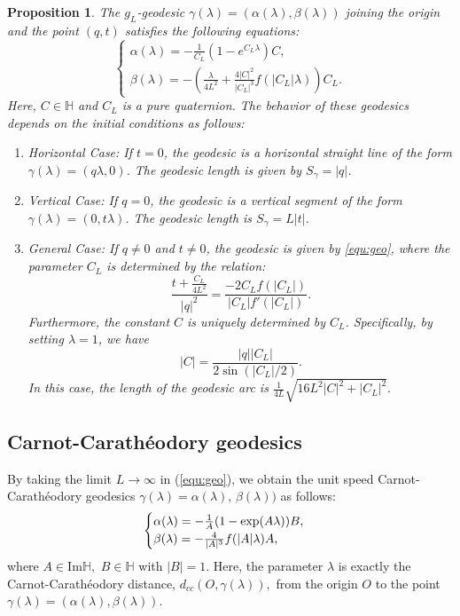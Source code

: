 \documentclass [12pt,a4paper]{amsart}
\renewcommand{\Im}{\textrm{Im}}
\newcommand{\mH}{\mathbb{H}}
\theoremstyle{plain}
\newtheorem{prop}[thm]{Proposition}
\theoremstyle{definition}
\numberwithin{equation}{section}
\begin{document}
\begin{prop}
The $g_L$-geodesic $\gamma(\lambda) = (\alpha(\lambda), \beta(\lambda))$ joining the origin and the point $(q,t)$ satisfies the following equations:
 \begin{equation}\label{equ:geo}
\begin{cases}
\alpha(\lambda) = -\frac{1}{{C}_L} \left( 1 - e^{C_L \lambda} \right) C, \\
\beta(\lambda) = -\left( \frac{\lambda}{4L^2} + \frac{4|C|^2}{|C_L|^3} f(|C_L|\lambda) \right) C_L.
\end{cases}
\end{equation}
Here, $C\in\mH$ and $C_L$ is a pure quaternion.
The behavior of these geodesics depends on the initial conditions as follows:
\begin{enumerate}
\item[(i)] {\it Horizontal Case:} If $t=0$, the geodesic is a horizontal straight line of the form $\gamma(\lambda) = (q\lambda, 0)$. The geodesic length is given by $S_\gamma = |q|$.

\item[(ii)] {\it Vertical Case:} If $q=0$, the geodesic is a vertical segment of the form $\gamma(\lambda) = (0, t\lambda)$. The geodesic length is $S_\gamma = L|t|$.
 
\item[(iii)] {\it General Case:} If $q \neq 0$ and $t \neq 0$, the geodesic is given by \eqref{equ:geo}, where the parameter $C_L$ is determined by the relation:
$$
\frac{t + \frac{C_L}{4L^2}}{|q|^2} = \frac{-2C_L f(|C_L|)}{|C_L| f'(|C_L|)}.
$$
Furthermore, the constant $C$ is uniquely determined by $C_L$. Specifically, by setting $\lambda=1$, we have
$$
|C| = \frac{|q||C_L|}{2\sin(|C_L|/2)}.
$$
In this case, the length of the geodesic arc is $\frac{1}{4L}\sqrt{16L^2|C|^2+|C_L|^2}.$
\end{enumerate}
\end{prop}




\subsection{Carnot-Carathéodory geodesics}\label{subsec:CC-geo}
By taking the limit $L\to\infty$ in  (\ref{equ:geo}), we obtain the unit speed Carnot-Carathéodory geodesics $\gamma(\lambda)=\alpha(\lambda),\,\beta(\lambda))$   as follows:
 \begin{equation}\label{equ:cc-geo}
\begin{cases}
\alpha(\lambda) =-\frac{1}{A}(1-{\rm exp}({A \lambda}))B,\\
\beta(\lambda)=-\frac{4}{|A|^3}f(|A|\lambda)A,
\end{cases}
\end{equation}
where $A\in\Im\mH,$ $B\in\mH$ with $|B|=1.$ 
Here, the parameter $\lambda$ is exactly the Carnot-Carathéodory distance, $d_{cc} (O, \gamma(\lambda)),$ from the origin $O$ to the point $\gamma(\lambda)=(\alpha(\lambda),\beta(\lambda)).$ 
\end{document}
